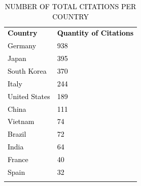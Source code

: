 \documentclass[lettersize,journal]{IEEEtran}
\begin{document}
\color{black}
\begin{table}[!ht]
  \centering
  \captionsetup{
    format=hang, %
    justification=raggedright,
    singlelinecheck=false,
    skip=9pt, %
  }
  \caption{\textcolor{black}{\MakeUppercase{Number of Total Citations per Country}}}
  \label{table:qtd_citacoes}
  \def\arraystretch{1.5}
  \begin{tabularx}{\textwidth}{>{\centering\arraybackslash}X>{\centering\arraybackslash}X}
    \arrayrulecolor{white}
    \rowcolor{white}
    \textbf{\textcolor{black}{Country}} & \textbf{\textcolor{black}{Quantity of Citations}} \\
    \arrayrulecolor{cor_tabela} \hline
    \textcolor{black}{Germany} & \cellcolor{cor_tabela}\textcolor{black}{938} \\
    \arrayrulecolor{cor_tabela} \hline
    \textcolor{black}{Japan} & \cellcolor{cor_tabela}\textcolor{black}{395} \\
    \arrayrulecolor{cor_tabela} \hline
    \textcolor{black}{South Korea} & \cellcolor{cor_tabela}\textcolor{black}{370} \\
    \arrayrulecolor{cor_tabela} \hline
    \textcolor{black}{Italy} & \cellcolor{cor_tabela}\textcolor{black}{244} \\
    \arrayrulecolor{cor_tabela} \hline
    \textcolor{black}{United States} & \cellcolor{cor_tabela}\textcolor{black}{189} \\
    \arrayrulecolor{cor_tabela} \hline
    \textcolor{black}{China} & \cellcolor{cor_tabela}\textcolor{black}{111} \\
    \arrayrulecolor{cor_tabela} \hline
    \textcolor{black}{Vietnam} & \cellcolor{cor_tabela}\textcolor{black}{74} \\
    \arrayrulecolor{cor_tabela} \hline
    \textcolor{black}{Brazil} & \cellcolor{cor_tabela}\textcolor{black}{72} \\
    \arrayrulecolor{cor_tabela} \hline
    \textcolor{black}{India} & \cellcolor{cor_tabela}\textcolor{black}{64} \\
    \arrayrulecolor{cor_tabela} \hline
    \textcolor{black}{France} & \cellcolor{cor_tabela}\textcolor{black}{40} \\
    \arrayrulecolor{cor_tabela} \hline
    \textcolor{black}{Spain} & \cellcolor{cor_tabela}\textcolor{black}{32} \\
    \arrayrulecolor{cor_tabela} \hline
  \end{tabularx}
\end{table}
\end{document}
